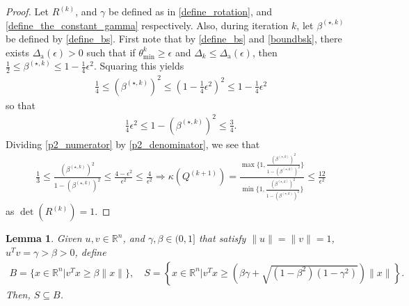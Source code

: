 \documentclass{article}
\newtheorem{lemma}[theorem]{Lemma}
\theoremstyle{case}
\numberwithin{theorem}{subsection}
\newcommand{\bs}{{\beta^{(\star, k)}}}
\newcommand{\ck}{{c^{(k)}}}
\newcommand{\dacco}{{\Delta_{\textrm{a}}}}
\newcommand{\dk}{\Delta_k}
\newcommand{\huk}{{{\hat u}^{(k)}}}
\newcommand{\qk}{{Q^{(k)}}}
\newcommand{\Rn}{\mathbb R^n}
\newcommand{\rotk}{{R^{(k)}}}
\newcommand{\sdk}{{\delta_k}}
\newcommand{\thetamink}{{\theta^k_{\textrm{min}}}}
\newcommand{\xk}{{x^{(k)}}}
\newcommand{\qkpo}{{Q^{(k+1)}}}
\begin{document}
\begin{proof}
Let $\rotk$, and $\gamma$ be defined as in \cref{define_rotation}, and \cref{define_the_constant_gamma} respectively.
Also, during iteration $k$, let $\bs$ be defined by \cref{define_bs}.
First note that by \cref{define_bs} and \cref{boundbsk}, there exists $\dacco(\epsilon) > 0$ such that if 
$\thetamink \ge \epsilon$ and $\dk \le \dacco(\epsilon)$, then
$\frac {1} 2 \le \bs \le 1 - \frac 1 4 \epsilon^2$.
Squaring this yields
\begin{align}
\frac {1} 4 \le \left(\bs\right)^2 \le \left(1 - \frac 1 4 \epsilon^2\right)^2 \le 1 - \frac 1 4 \epsilon^2 \label{p2_numerator}
\end{align}
so that
\begin{align}
\frac 1 4 \epsilon^2 \le 1 - \left(\bs\right)^2 \le \frac 3 4. \label{p2_denominator}
\end{align}
Dividing \cref{p2_numerator} by \cref{p2_denominator}, we see that
\begin{align*}
\frac 1 3
\le \frac{\left(\bs\right)^2}{1 - \left(\bs\right)^2}
\le \frac {4 - \epsilon^2}{\epsilon^2} \le \frac {4}{\epsilon^2}
\Longrightarrow 
\kappa(\qkpo) 
= \frac{\max\{1, \frac{\left(\bs\right)^2}{1 - \left(\bs\right)^2}\}}{\min\{1, \frac{\left(\bs\right)^2}{1 - \left(\bs\right)^2}\}} 
\le \frac {12}{\epsilon^2}
\end{align*}
as $\det(\rotk) = 1$.
\end{proof}




\begin{lemma}
\label{cone_subset_cone}
Given $u, v \in \Rn$, and $\gamma, \beta \in (0, 1]$ that satisfy $\|u\| = \|v\|= 1$, $u^Tv = \gamma > \beta > 0$, define
\begin{align*}
B = \{x\in\Rn | {v}^Tx \ge \beta\|x\|\}, \quad
S = \left\{x\in\Rn \bigg| v^Tx \ge \left(\beta\gamma + \sqrt{(1 - \beta^2)\left(1 - \gamma^2\right)}\right)\|x\| \right\}. 
\end{align*}
Then, $S \subseteq B$.
\end{lemma}
\end{document}
